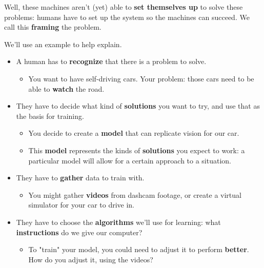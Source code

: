         Well, these machines aren't (yet) able to \textbf{set themselves up} to solve these problems: humans have to set up the system so the machines can succeed. We call this \textbf{framing} the problem.
        
        We'll use an example to help explain.
        
        \begin{itemize}
            \item A human has to \textbf{recognize} that there is a problem to solve.
                \begin{itemize}
                    \item \miniex You want to have self-driving cars. Your problem: those cars need to be able to \textbf{watch} the road.
                \end{itemize}
                
            \item They have to decide what kind of \textbf{solutions} you want to try, and use that as the basis for training.
                \begin{itemize}
                    \item \miniex You decide to create a \textbf{model} that can replicate vision for our car.
                    \item This \textbf{model} represents the kinds of \textbf{solutions} you expect to work: a particular model will allow for a certain approach to a situation.
                \end{itemize}
                
            \item They have to \textbf{gather} data to train with.
                \begin{itemize}
                    \item \miniex You might gather \textbf{videos} from dashcam footage, or create a virtual simulator for your car to drive in. 
                \end{itemize}
                
                
            \item They have to choose the \textbf{algorithms} we'll use for learning: what \textbf{instructions} do we give our computer?
                \begin{itemize}
                    \item \miniex To "train" your model, you could need to adjust it to perform \textbf{better}. How do you adjust it, using the videos?
                \end{itemize}
                

\end{itemize}
